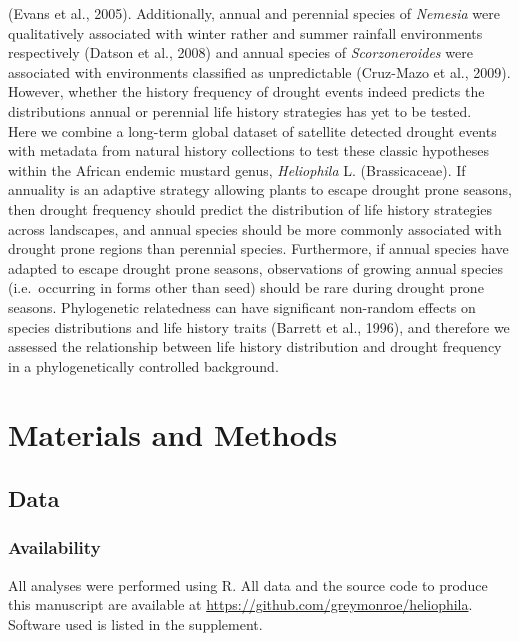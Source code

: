 \documentclass[man,floatsintext]{apa6}
\theoremstyle{definition}
\theoremstyle{definition}
\theoremstyle{definition}
\theoremstyle{remark}
\begin{document}
(Evans et al., 2005). Additionally, annual and perennial species of
\emph{Nemesia} were qualitatively associated with winter rather and
summer rainfall environments respectively (Datson et al., 2008) and
annual species of \emph{Scorzoneroides} were associated with
environments classified as unpredictable (Cruz-Mazo et al., 2009).
However, whether the history frequency of drought events indeed predicts
the distributions annual or perennial life history strategies has yet to
be tested.\\
Here we combine a long-term global dataset of satellite detected drought
events with metadata from natural history collections to test these
classic hypotheses within the African endemic mustard genus,
\emph{Heliophila} L. (Brassicaceae). If annuality is an adaptive
strategy allowing plants to escape drought prone seasons, then drought
frequency should predict the distribution of life history strategies
across landscapes, and annual species should be more commonly associated
with drought prone regions than perennial species. Furthermore, if
annual species have adapted to escape drought prone seasons,
observations of growing annual species (i.e.~occurring in forms other
than seed) should be rare during drought prone seasons. Phylogenetic
relatedness can have significant non-random effects on species
distributions and life history traits (Barrett et al., 1996), and
therefore we assessed the relationship between life history distribution
and drought frequency in a phylogenetically controlled background.

\hypertarget{materials-and-methods}{%
\section{Materials and Methods}\label{materials-and-methods}}

\hypertarget{data}{%
\subsection{Data}\label{data}}

\hypertarget{availability}{%
\subsubsection{Availability}\label{availability}}

All analyses were performed using R. All data and the source code to
produce this manuscript are available at
\url{https://github.com/greymonroe/heliophila}. Software used is listed
in the supplement.
\end{document}
